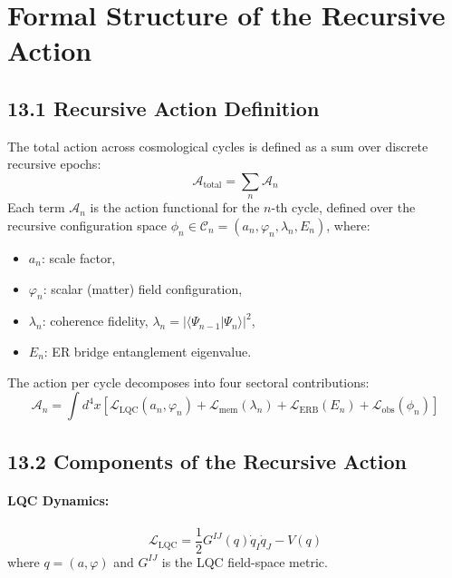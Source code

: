 \section{Formal Structure of the Recursive Action}
\label{sec:recursive-action-formal}

\subsection{13.1 Recursive Action Definition}

The total action across cosmological cycles is defined as a sum over discrete recursive epochs:
\begin{equation}
\mathcal{A}_{\text{total}} = \sum_{n} \mathcal{A}_n
\end{equation}
Each term \( \mathcal{A}_n \) is the action functional for the \( n \)-th cycle, defined over the recursive configuration space \( \phi_n \in \mathcal{C}_n = (a_n, \varphi_n, \lambda_n, E_n) \), where:
\begin{itemize}
    \item \( a_n \): scale factor,
    \item \( \varphi_n \): scalar (matter) field configuration,
    \item \( \lambda_n \): coherence fidelity, \( \lambda_n = |\langle \Psi_{n-1} | \Psi_n \rangle|^2 \),
    \item \( E_n \): ER bridge entanglement eigenvalue.
\end{itemize}

The action per cycle decomposes into four sectoral contributions:
\begin{equation}
\mathcal{A}_n = \int d^4x \left[
\mathcal{L}_{\text{LQC}}(a_n, \varphi_n) +
\mathcal{L}_{\text{mem}}(\lambda_n) +
\mathcal{L}_{\text{ERB}}(E_n) +
\mathcal{L}_{\text{obs}}(\phi_n)
\right]
\end{equation}

\subsection{13.2 Components of the Recursive Action}

\paragraph{LQC Dynamics:}
\[
\mathcal{L}_{\text{LQC}} = \frac{1}{2} G^{IJ}(q) \dot{q}_I \dot{q}_J - V(q)
\]
where \( q = (a, \varphi) \) and \( G^{IJ} \) is the LQC field-space metric.

